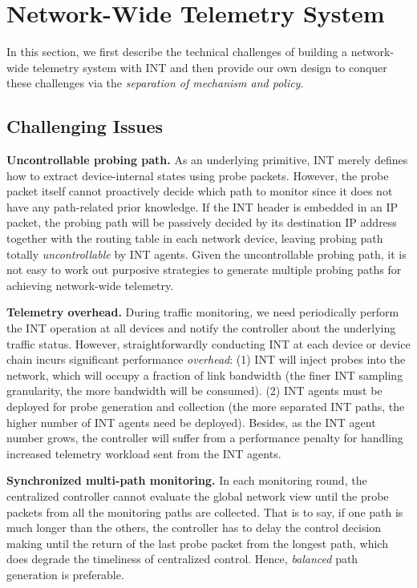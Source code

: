 \section{Network-Wide Telemetry System}
\label{sec:mechanism}

In this section, we first describe the technical challenges of building a network-wide telemetry system with INT and then provide our own design to conquer these challenges via the \emph{separation of mechanism and policy}.

\subsection{Challenging Issues}
\label{subsec:challenge}

\textbf{Uncontrollable probing path.}
As an underlying primitive, INT merely defines how to extract device-internal states using probe packets. However, the probe packet itself cannot proactively decide which path to monitor since it does not have any path-related prior knowledge. If the INT header is embedded in an IP packet, the probing path will be passively decided by its destination IP address together with the routing table in each network device, leaving probing path totally \emph{uncontrollable} by INT agents. Given the uncontrollable probing path, it is not easy to work out purposive strategies to generate multiple probing paths for achieving network-wide telemetry. 

\textbf{Telemetry overhead.}
During traffic monitoring, we need periodically perform the INT operation at all devices and notify the controller about the underlying traffic status. However, straightforwardly conducting INT at each device or device chain incurs significant performance \emph{overhead}: (1) INT will inject probes into the network, which will occupy a fraction of link bandwidth (the finer INT sampling granularity, the more bandwidth will be consumed). (2) INT agents must be deployed for probe generation and collection (the more separated INT paths, the higher number of INT agents need be deployed). Besides, as the INT agent number grows, the controller will suffer from a performance penalty for handling increased telemetry workload sent from the INT agents.

\textbf{Synchronized multi-path monitoring.}
In each monitoring round, the centralized controller cannot evaluate the global network view until the probe packets from all the monitoring paths are collected. That is to say, if one path is much longer than the others, the controller has to delay the control decision making until the return of the last probe packet from the longest path, which does degrade the timeliness of centralized control. Hence, \emph{balanced} path generation is preferable.

